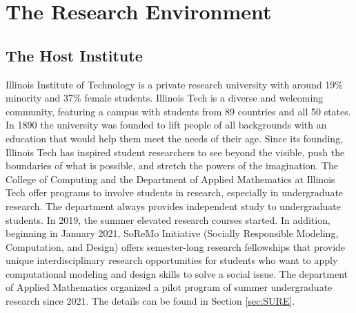 \documentclass[11pt]{NSFamsart}
\begin{document}















\section{The Research Environment}


 
\subsection{The Host Institute}

Illinois Institute of Technology is a private research university with around 19\% minority and 37\% female students. Illinois Tech is a diverse and welcoming community, featuring a campus with students from 89 countries and all 50 states. In 1890 the university was founded to lift people of all backgrounds with an education that would help them meet the needs of their age. Since its founding, Illinois Tech has inspired student researchers to see beyond the visible, push the boundaries of what is possible, and stretch the powers of the imagination. The College of Computing
and the Department of Applied Mathematics at Illinois Tech offer programs to involve students
in research, especially in undergraduate research. The department always provides independent study to undergraduate students. In 2019, the summer elevated research courses started. In addition, beginning in January 2021, SoReMo Initiative (Socially Responsible Modeling, Computation, and Design) offers semester-long research fellowships that provide unique interdisciplinary research opportunities for students who want to apply computational modeling and design skills to solve a social issue. The department of Applied Mathematics organized a pilot program of summer undergraduate research since 2021. The details can be found in Section \ref{sec:SURE}.
\end{document}
